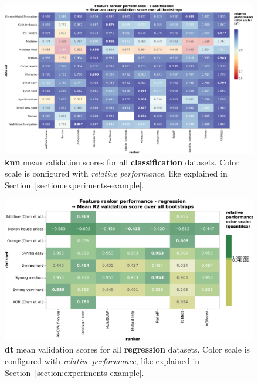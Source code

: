 \documentclass[../main.tex]{subfiles}
\begin{document}
\begin{figure}[ht]
    \centering
    \includegraphics[width=\linewidth]{report/images/results-all-datasets-mean-validation-knn.pdf}
    \caption{\textbf{\gls{knn}} mean validation scores for all \textbf{classification} datasets. Color scale is configured with \textit{relative performance}, like explained in Section~\ref{section:experiments-example}.}
    \label{fig:results-all-datasets-mean-validation-knn}
\end{figure}


\begin{figure}[ht]
    \centering
    \includegraphics[width=\linewidth]{report/images/results-all-datasets-mean-validation-dt-regression.pdf}
    \caption{\textbf{\gls{dt}} mean validation scores for all \textbf{regression} datasets. Color scale is configured with \textit{relative performance}, like explained in Section~\ref{section:experiments-example}.}
    \label{fig:results-all-datasets-mean-validation-dt-regression}
\end{figure}
\end{document}
